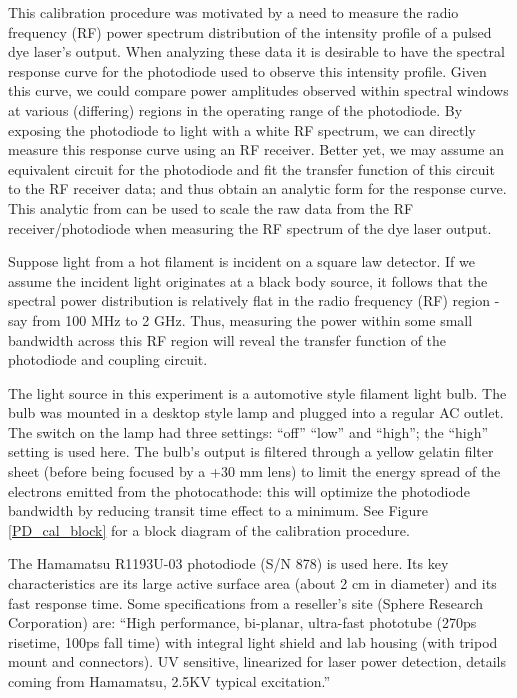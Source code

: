 
This calibration procedure was motivated by a need to measure the radio frequency (RF) power spectrum distribution of the intensity profile of a pulsed dye laser's output. When analyzing these data it is desirable to have the spectral response curve for the photodiode used to observe this intensity profile. Given this curve, we could compare power amplitudes observed within spectral windows at various (differing) regions in the operating range of the photodiode. By exposing the photodiode to light with a white RF spectrum, we can directly measure this response curve using an RF receiver. Better yet, we may assume an equivalent circuit for the photodiode and fit the transfer function of this circuit to the RF receiver data; and thus obtain an analytic form for the response curve. This analytic from can be used to scale the raw data from the RF receiver/photodiode when measuring the RF spectrum of the dye laser output.

Suppose light from a hot filament is incident on a square law detector. If we assume the incident light originates at a black body source, it follows that the spectral power distribution is relatively flat in the radio frequency (RF) region - say from 100 MHz to 2 GHz. Thus, measuring the power within some small bandwidth across this RF region will reveal the transfer function of the photodiode and coupling circuit.


The light source in this experiment is a automotive style filament light bulb. The bulb was mounted in a desktop style lamp and plugged into a regular AC outlet. The switch on the lamp had three settings: ``off'' ``low'' and ``high''; the ``high'' setting is used here. The bulb's output is filtered through a yellow gelatin filter sheet (before being focused by a +30 mm lens) to limit the energy spread of the electrons emitted from the photocathode: this will optimize the photodiode bandwidth by reducing transit time effect to a minimum. See Figure \ref{PD_cal_block} for a block diagram of the calibration procedure.

The Hamamatsu R1193U-03 photodiode (S/N 878) is used here. Its key characteristics are its large active surface area (about 2 cm in diameter) and its fast response time. Some specifications from a reseller's site (Sphere Research Corporation) are: ``High performance, bi-planar, ultra-fast phototube (270ps risetime, 100ps fall time) with integral light shield and lab housing (with tripod mount and connectors). UV sensitive, linearized for laser power detection, details coming from Hamamatsu, 2.5KV typical excitation.''

